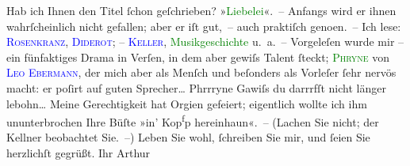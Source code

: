                Hab ich Ihnen den Titel ſchon geſchrieben?{\dotstwo} »\textcolor{green}{Liebelei}{}\ledrightnote{\textcolor{green}{Liebelei. Schauspiel in drei Akten}}«. – Anfangs wird er ihnen wahrſcheinlich
               nicht {\pb}gefallen; aber er iſt gut, – auch praktiſch
                  geno{\geminationm}en. –\pend
           \pstart
           Ich lese: \textsc{\textcolor{blue}{Rosenkranz}{}\ledrightnote{\textcolor{blue}{Karl Rosenkranz}}, \textcolor{green}{\textcolor{blue}{Diderot}{}\ledrightnote{\textcolor{blue}{Denis Diderot}}}{}\ledrightnote{\textcolor{green}{Diderots Leben und Werke}}; – \textcolor{blue}{Keller}{}\ledrightnote{\textcolor{blue}{Otto Keller}}}, \textcolor{green}{Musikgeschichte}{}\ledrightnote{\textcolor{green}{Geschichte der Musik}} u. a. –\pend
           \pstart
           Vorgeleſen wurde mir – ein fünfaktiges Drama in Verſen, in dem aber gewiſs Talent
               ſteckt; \textcolor{green}{\textsc{Phryne}}{}\ledrightnote{\textcolor{green}{Die Athenerin}} von \textcolor{blue}{\textsc{Leo Ebermann}}{}\ledrightnote{\textcolor{blue}{Leo Ebermann}}, der mich aber als Menſch und beſonders als Vorleſer ſehr nervös macht: er
               poſirt auf guten Sprecher{\dots}\pend
           \pstart
           Phrrryne{\dotstwo}\pend
           \pstart
           Gawiſs {\dotstwo} du darrrfſt nicht länger lebohn{\dots}\pend
           \pstart
           Meine Gerechtigkeit hat Orgien {\pb}gefeiert; eigentlich
               wollte ich ihm ununterbrochen Ihre Büſte »in’  Kop\substVorne{}\textsuperscript{f}\substDazwischen{}p\substHinten{} hereinhaun«. – (Lachen Sie nicht; der Kellner beobachtet Sie. –)\pend
           \pstart
           Leben Sie wohl, ſchreiben Sie mir, und ſeien Sie herzlichſt gegrüßt.\pend
           \pstart Ihr \spacefill\mbox{Arthur}\pend{}\endnumbering{}  
      